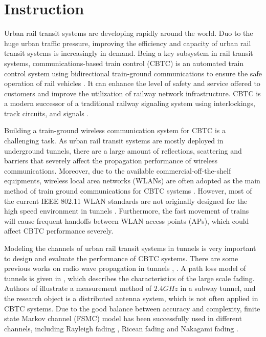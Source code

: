 \documentclass[conference]{IEEEtran}
\begin{document}
\IEEEpeerreviewmaketitle





\section{Instruction}
Urban rail transit systems are developing rapidly around the world. Duo to the huge urban traffic pressure, improving the efficiency and capacity of urban rail transit systems is increasingly in demand. Being a key subsystem in rail transit systems, communications-based train control (CBTC) is an automated train control system using  bidirectional train-ground communications to ensure the safe operation of rail vehicles \cite{What_is_communication-based_train_control}. It can enhance the level of safety and service offered to customers and improve the utilization of railway network infrastructure. CBTC is a modern successor of a traditional railway signaling system using interlockings, track circuits, and signals \cite{CBTC_Standard}.



Building a train-ground wireless communication system for CBTC is a challenging task. As urban rail transit systems are mostly deployed in underground tunnels, there are a large amount of reflections, scattering and barriers that  severely affect the propagation performance of wireless communications. Moreover, due to the available commercial-off-the-shelf equipments, wireless local area networks (WLANs) are often adopted as the main method of train ground communications for CBTC systems \cite{ZHULI_FSMC}. However, most of the current IEEE 802.11 WLAN standards are not originally designed for the high speed environment in tunnels \cite{ZHULI_FSMC,ZFBT12}. Furthermore, the fast movement of trains will cause frequent handoffs between WLAN access points (APs), which could affect CBTC performance severely.

Modeling the channels of urban rail transit systems in tunnels is very important to design and evaluate the performance of CBTC systems. There are some previous works  on radio wave propagation in tunnels \cite{ZHANGYP_Enhancement_of_rectangular_tunnel_waveguide_model}, \cite{ZhangYP_Novel_Model}. A path loss model of tunnels is given in \cite{ZhangYP_Novel_Model}, which describes the characteristics of the large scale fading. Authors of \cite{KEGUAN} illustrate a measurement method of $2.4GHz$ in a subway tunnel, and the research object is a distributed antenna system, which is not often applied in CBTC systems. Due to the good balance between accuracy and complexity, finite state Markov channel (FSMC) model has been successfully used in different channels, including Rayleigh fading \cite{Finite_state_Markov_channel_a_useful_model_for_radio_communication_channels}, Ricean fading  \cite{Finite-state_Markov_modeling_of_correlated_Rician-fading_channels} and Nakagami fading \cite{Fast_simulation_of_diversity_Nakagami_fading_channels_using_finite-state_Markov_models}.
\end{document}
